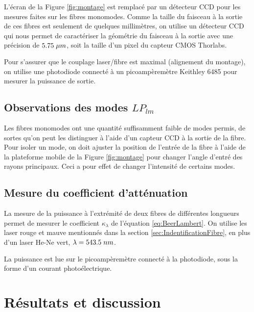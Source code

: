 \documentclass[10pt,letterpaper,twocolumn]{article}
\newcommand{\s}{\hspace{0.1cm}}
\begin{document}
L'écran de la Figure \ref{fig:montage} est remplacé par un détecteur CCD pour les mesures faites sur les fibres monomodes. Comme la taille du faisceau à la sortie de ces fibres est seulement de quelques millimètres, on utilise un détecteur CCD qui nous permet de caractériser la géométrie du faisceau à la sortie avec une précision de $5.75\s \mu m$, soit la taille d'un pixel du capteur CMOS Thorlabs.\par
Pour s'assurer que le couplage laser/fibre est maximal (alignement du montage), on utilise une photodiode connecté à un picoampèremètre Keithley 6485 pour mesurer la puissance de sortie. 
\subsection{Observations des modes $LP_{lm}$}
Les fibres monomodes ont une quantité suffisamment faible de modes permis, de sortes qu'on peut les distinguer à l'aide d'un capteur CCD à la sortie de la fibre. Pour isoler un mode, on doit ajuster la position de l'entrée de la fibre à l'aide de la plateforme mobile de la Figure \ref{fig:montage} pour changer l'angle d'entré des rayons principaux. Ceci a pour effet de changer l'intensité de certains modes.
\subsection{Mesure du coefficient d'atténuation}\label{sec:attenuation}
La mesure de la puissance à l'extrémité de deux fibres de différentes longueurs permet de mesurer le coefficient $\kappa_\lambda$ de l'équation \ref{eq:BeerLambert}. On utilise les laser rouge et mauve mentionnés dans la section \ref{sec:IndentificationFibre}, en plus d'un laser He-Ne vert, $\lambda = 543.5\s nm$. \par
La puissance est lue sur le picoampèremètre connecté à la photodiode, sous la forme d'un courant photoélectrique. 

\section{Résultats et discussion}\label{sec:resultats} %
\end{document}
